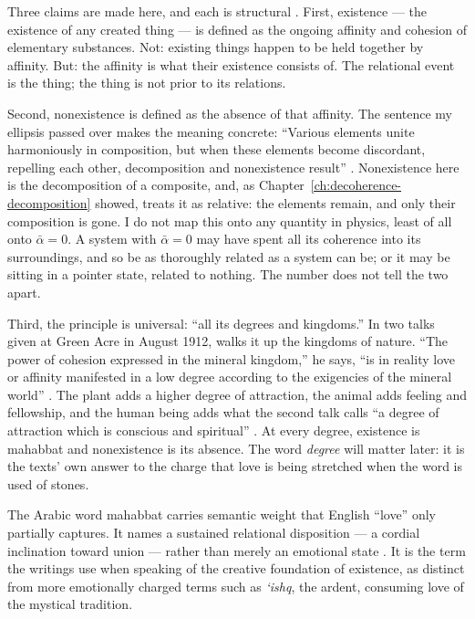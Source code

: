 Three claims are made here, and each is structural \citep{AdamsMahabbat}. First, existence — the existence of any created thing — is defined as the ongoing affinity and cohesion of elementary substances. Not: existing things happen to be held together by affinity. But: the affinity is what their existence consists of. The relational event is the thing; the thing is not prior to its relations.

Second, nonexistence is defined as the absence of that affinity. The sentence my ellipsis passed over makes the meaning concrete: ``Various elements unite harmoniously in composition, but when these elements become discordant, repelling each other, decomposition and nonexistence result'' \citep[Talk 48]{PUP}. Nonexistence here is the decomposition of a composite, and, as Chapter~\ref{ch:decoherence-decomposition} showed, \AbdulBaha treats it as relative: the elements remain, and only their composition is gone. I do not map this onto any quantity in physics, least of all onto $\bar{\alpha} = 0$. A system with $\bar{\alpha} = 0$ may have spent all its coherence into its surroundings, and so be as thoroughly related as a system can be; or it may be sitting in a pointer state, related to nothing. The number does not tell the two apart.

Third, the principle is universal: ``all its degrees and kingdoms.'' In two talks given at Green Acre in August 1912, \AbdulBaha walks it up the kingdoms of nature. ``The power of cohesion expressed in the mineral kingdom,'' he says, ``is in reality love or affinity manifested in a low degree according to the exigencies of the mineral world'' \citep[Talk 89]{PUP}. The plant adds a higher degree of attraction, the animal adds feeling and fellowship, and the human being adds what the second talk calls ``a degree of attraction which is conscious and spiritual'' \citep[Talk 92]{PUP}. At every degree, existence is mahabbat and nonexistence is its absence. The word \emph{degree} will matter later: it is the texts' own answer to the charge that love is being stretched when the word is used of stones.

The Arabic word mahabbat carries semantic weight that English ``love'' only partially captures. It names a sustained relational disposition — a cordial inclination toward union — rather than merely an emotional state \citep{AdamsMahabbat}. It is the term the writings use when speaking of the creative foundation of existence, as distinct from more emotionally charged terms such as \textit{`ishq}, the ardent, consuming love of the mystical tradition.

